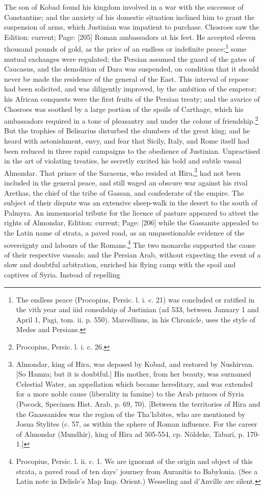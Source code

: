 The son of Kobad found his kingdom involved in a war with the successor of Constantine; and the anxiety of his domestic situation inclined him to grant the suspension of arms, which Justinian was impatient to purchase. Chosroes saw the Edition: current; Page: [205] Roman ambassadors at his feet. He accepted eleven thousand pounds of gold, as the price of an endless or indefinite peace;\footnote{The endless peace (Procopius, Persic. l. i. c. 21) was concluded or ratified in the vith year and iiid consulship of Justinian (ad 533, between January 1 and April 1, Pagi, tom. ii. p. 550). Marcellinus, in his Chronicle, uses the style of Medes and Persians.} some mutual exchanges were regulated; the Persian assumed the guard of the gates of Caucasus, and the demolition of Dara was suspended, on condition that it should never be made the residence of the general of the East. This interval of repose had been solicited, and was diligently improved, by the ambition of the emperor; his African conquests were the first fruits of the Persian treaty; and the avarice of Chosroes was soothed by a large portion of the spoils of Carthage, which his ambassadors required in a tone of pleasantry and under the colour of friendship.\footnote{Procopius, Persic. l. i. c. 26.} But the trophies of Belisarius disturbed the slumbers of the great king; and he heard with astonishment, envy, and fear that Sicily, Italy, and Rome itself had been reduced in three rapid campaigns to the obedience of Justinian. Unpractised in the art of violating treaties, he secretly excited his bold and subtle vassal Almondar. That prince of the Saracens, who resided at Hira,\footnote{Almondar, king of Hira, was deposed by Kobad, and restored by Nushirvan. [So Hamza; but it is doubtful.] His mother, from her beauty, was surnamed Celestial Water, an appellation which became hereditary, and was extended for a more noble cause (liberality in famine) to the Arab princes of Syria (Pocock, Specimen Hist. Arab. p. 69, 70). [Between the territories of Hira and the Gnassanides was the region of the Tha\texthebrew{}’labites, who are mentioned by Josua Stylites (c. 57, as within the sphere of Roman influence. For the career of Almondar (Mundhir), king of Hira ad 505-554, cp. Nöldeke, Tabari, p. 170-1.]} had not been included in the general peace, and still waged an obscure war against his rival Arethas, the chief of the tribe of Gassan, and confederate of the empire. The subject of their dispute was an extensive sheep-walk in the desert to the south of Palmyra. An immemorial tribute for the licence of pasture appeared to attest the rights of Almondar, Edition: current; Page: [206] while the Gassanite appealed to the Latin name of strata, a paved road, as an unquestionable evidence of the sovereignty and labours of the Romans.\footnote{Procopius, Persic. l. ii. c. 1. We are ignorant of the origin and object of this strata, a paved road of ten days\texthebrew{}’ journey from Auranitis to Babylonia. (See a Latin note in Delisle\texthebrew{}’s Map Imp. Orient.) Wesseling and d\texthebrew{}’Anville are silent.} The two monarchs supported the cause of their respective vassals; and the Persian Arab, without expecting the event of a slow and doubtful arbitration, enriched his flying camp with the spoil and captives of Syria. Instead of repelling 